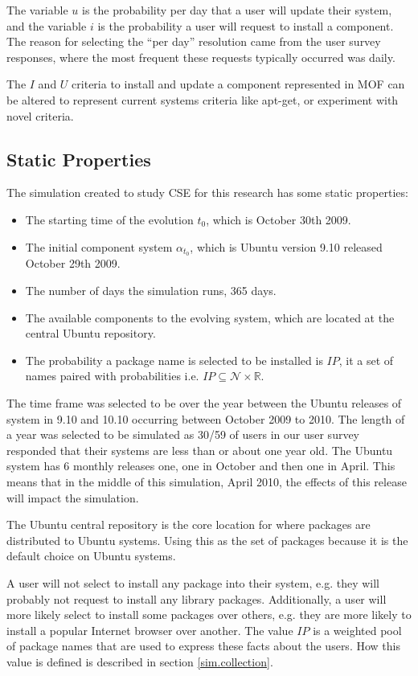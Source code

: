 The variable $u$ is the probability per day that a user will update their system, and the variable $i$ is the probability a user will request to install a component.
The reason for selecting the ``per day'' resolution came from the user survey responses, where the most frequent these requests typically occurred was daily.

The $I$ and $U$ criteria to install and update a component represented in MOF can be altered to represent current systems criteria like apt-get,
or experiment with novel criteria.

\subsection{Static Properties}
The simulation created to study CSE for this research has some static properties:
\begin{itemize}
  \item The starting time of the evolution $t_0$, which is October 30th 2009.
  \item The initial component system $\alpha_{t_0}$, which is Ubuntu version 9.10 released October 29th 2009.
  \item The number of days the simulation runs, 365 days.
  \item The available components to the evolving system, which are located at the central Ubuntu repository.
  \item The probability a package name is selected to be installed is $IP$, it a set of names paired with probabilities i.e. $IP \subseteq \mathcal{N} \times \mathbb{R}$.
\end{itemize}

The time frame was selected to be over the year between the Ubuntu releases of system in 9.10 and 10.10 occurring between October 2009 to 2010.
The length of a year was selected to be simulated as 30/59 of users in our user survey responded that their systems are less than or about one year old.
The Ubuntu system has 6 monthly releases one, one in October and then one in April.
This means that in the middle of this simulation, April 2010, the effects of this release will impact the simulation.

The Ubuntu central repository is the core location for where packages are distributed to Ubuntu systems.
Using this as the set of packages because it is the default choice on Ubuntu systems.

A user will not select to install any package into their system, e.g. they will probably not request to install any library packages.
Additionally, a user will more likely select to install some packages over others, e.g. they are more likely to install a popular Internet browser over another.
The value $IP$ is a weighted pool of package names that are used to express these facts about the users.
How this value is defined is described in section \ref{sim.collection}.

